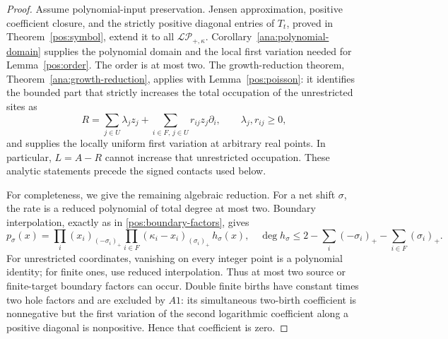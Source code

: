 \documentclass[reqno]{amsart}
\theoremstyle{definition}
\theoremstyle{remark}
\begin{document}
\begin{proof}
Assume polynomial-input preservation.  Jensen approximation, positive
coefficient closure, and the strictly positive diagonal entries of \(T_t\),
proved in Theorem~\ref{pos:symbol}, extend it to all
\(\mathcal{LP}_{+,\kappa}\).
Corollary~\ref{ana:polynomial-domain} supplies the polynomial domain and the
local first variation needed for
Lemma~\ref{pos:order}.  The order is at most two.
The growth-reduction theorem, Theorem~\ref{ana:growth-reduction}, applies with
Lemma~\ref{pos:poisson}: it identifies the bounded part that strictly increases
the total occupation of the unrestricted sites as
\[
 R=\sum_{j\in U}\lambda_jz_j+
   \sum_{i\in F,\,j\in U}r_{ij}z_j\partial_i,
 \qquad \lambda_j,r_{ij}\ge0,
\]
and supplies the locally uniform first variation at arbitrary real points.
In particular, \(L=A-R\) cannot increase that unrestricted occupation.
These analytic statements precede the signed contacts used below.

For completeness, we give the remaining algebraic reduction.
For a net shift \(\sigma\), the rate is a reduced polynomial of total degree
at most two.  Boundary interpolation, exactly as in
\eqref{pos:boundary-factors}, gives
\begin{equation}\label{pos:mixed-boundaries}
 p_\sigma(x)=\prod_i(x_i)_{(-\sigma_i)_+}
 \prod_{i\in F}(\kappa_i-x_i)_{(\sigma_i)_+}\,h_\sigma(x),
 \quad
 \deg h_\sigma\le2-\sum_i(-\sigma_i)_+-\sum_{i\in F}(\sigma_i)_+.
\end{equation}
For unrestricted coordinates, vanishing on every integer point is a polynomial
identity; for finite ones, use reduced interpolation.  Thus at most two source
or finite-target boundary factors can occur.
Double finite births have constant times two hole factors and are excluded by
\(A1\): its simultaneous two-birth coefficient is nonnegative but the first
variation of the second logarithmic coefficient along a positive diagonal is
nonpositive.  Hence that coefficient is zero.


\end{proof}
\end{document}
